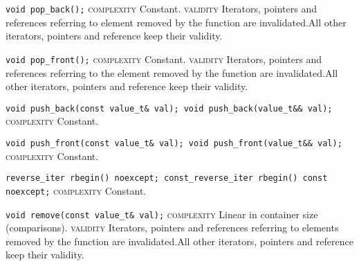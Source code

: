 \noindent{}\hspace*{0.25em}\lstinline[basicstyle=\ttfamily\color{cgreen}]{void pop_back();} \textsc{complexity} Constant. \textsc{validity} Iterators, pointers and references referring to element removed by the function are invalidated.All other iterators, pointers and reference keep their validity.\\\vspace{-0.6em}

\noindent{}\hspace*{0.25em}\lstinline[basicstyle=\ttfamily\color{cgreen}]{void pop_front();} \textsc{complexity} Constant. \textsc{validity} Iterators, pointers and references referring to the element removed by the function are invalidated.All other iterators, pointers and reference keep their validity.\\\vspace{-0.6em}

\noindent{}\hspace*{0.25em}\lstinline[basicstyle=\ttfamily\color{cgreen}]{void push_back(const value_t& val); void push_back(value_t&& val);} \textsc{complexity} Constant.\\\vspace{-0.6em}

\noindent{}\hspace*{0.25em}\lstinline[basicstyle=\ttfamily\color{cgreen}]{void push_front(const value_t& val); void push_front(value_t&& val);} \textsc{complexity} Constant.\\\vspace{-0.6em}

\noindent{}\hspace*{0.25em}\lstinline[basicstyle=\ttfamily\color{cgreen}]{reverse_iter rbegin() noexcept; const_reverse_iter rbegin() const noexcept;} \textsc{complexity} Constant.\\\vspace{-0.6em}

\noindent{}\hspace*{0.25em}\lstinline[basicstyle=\ttfamily\color{corange}]{void remove(const value_t& val);} \textsc{complexity} Linear in container size (comparisons). \textsc{validity} Iterators, pointers and references referring to elements removed by the function are invalidated.All other iterators, pointers and reference keep their validity.\\\vspace{-0.6em}

